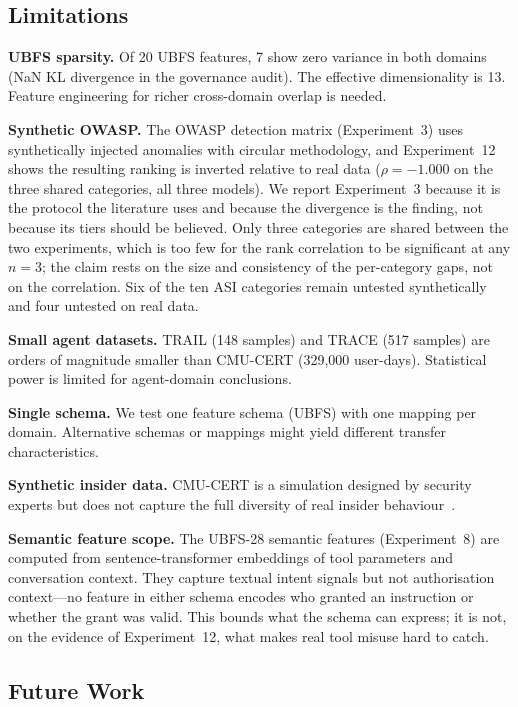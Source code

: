 \documentclass[conference]{IEEEtran}
\begin{document}
\subsection{Limitations}

\textbf{UBFS sparsity.} Of 20 UBFS features, 7 show zero variance in both domains (NaN KL divergence in the governance audit). The effective dimensionality is 13. Feature engineering for richer cross-domain overlap is needed.

\textbf{Synthetic OWASP.} The OWASP detection matrix (Experiment~3) uses synthetically injected anomalies with circular methodology, and Experiment~12 shows the resulting ranking is inverted relative to real data ($\rho = -1.000$ on the three shared categories, all three models). We report Experiment~3 because it is the protocol the literature uses and because the divergence is the finding, not because its tiers should be believed. Only three categories are shared between the two experiments, which is too few for the rank correlation to be significant at any $n{=}3$; the claim rests on the size and consistency of the per-category gaps, not on the correlation. Six of the ten ASI categories remain untested synthetically and four untested on real data.

\textbf{Small agent datasets.} TRAIL (148 samples) and TRACE (517 samples) are orders of magnitude smaller than CMU-CERT (329,000 user-days). Statistical power is limited for agent-domain conclusions.

\textbf{Single schema.} We test one feature schema (UBFS) with one mapping per domain. Alternative schemas or mappings might yield different transfer characteristics.

\textbf{Synthetic insider data.} CMU-CERT is a simulation designed by security experts but does not capture the full diversity of real insider behaviour~\cite{glasser2013bridging}.

\textbf{Semantic feature scope.} The UBFS-28 semantic features (Experiment~8) are computed from sentence-transformer embeddings of tool parameters and conversation context. They capture textual intent signals but not authorisation context---no feature in either schema encodes who granted an instruction or whether the grant was valid. This bounds what the schema can express; it is not, on the evidence of Experiment~12, what makes real tool misuse hard to catch.

\subsection{Future Work}
\end{document}
